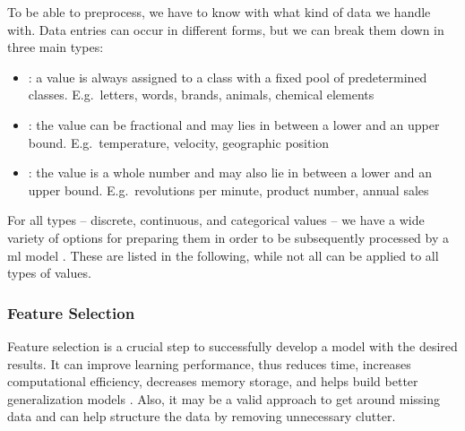 To be able to preprocess, we have to know with what kind of data we handle with.
Data entries can occur in different forms, but we can break them down in three main types:
\begin{itemize}
    \item {}: a value is always assigned to a class with a fixed pool of predetermined classes.
          E.g.\ letters, words, brands, animals, chemical elements
    \item {}: the value can be fractional and may lies in between a lower and an upper bound.
          E.g.\ temperature, velocity, geographic position
    \item {}: the value is a whole number and may also lie in between a lower and an upper bound.
          E.g.\ revolutions per minute, product number, annual sales
\end{itemize}

For all types -- discrete, continuous, and categorical values -- we have a wide variety of options for preparing them in order to be subsequently processed by a \gls{ml} model \cite{duong2021}.
These are listed in the following, while not all can be applied to all types of values.

\subsubsection{Feature Selection}

Feature selection is a crucial step to successfully develop a model with the desired results.
It can improve learning performance, thus reduces time, increases computational efficiency, decreases memory storage, and helps build better generalization models \cite{li2017feature}.
Also, it may be a valid approach to get around missing data and can help structure the data by removing unnecessary clutter.

